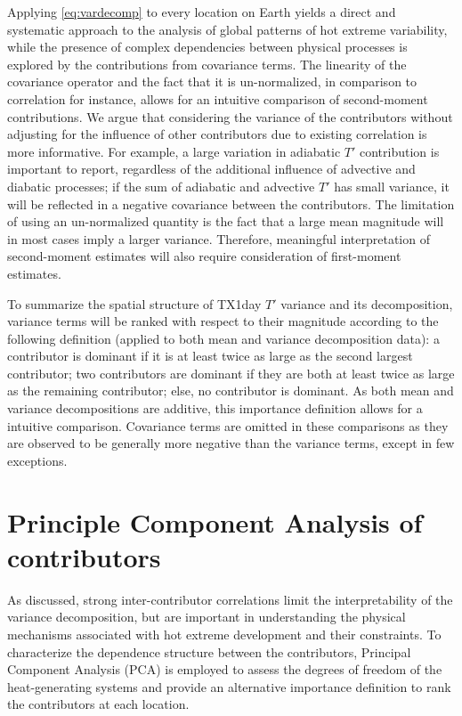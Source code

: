 \documentclass[11pt,a4paper,twoside,openright]{report}
\theoremstyle{definition}
\begin{document}
Applying \eqref{eq:vardecomp} to every location on Earth yields a direct and systematic approach to the analysis of global patterns of hot extreme variability, while the presence of complex dependencies between physical processes is explored by the contributions from covariance terms. The linearity of the covariance operator and the fact that it is un-normalized, in comparison to correlation for instance, allows for an intuitive comparison of second-moment contributions. We argue that considering the variance of the contributors without adjusting for the influence of other contributors due to existing correlation is more informative. For example, a large variation in adiabatic \(T'\) contribution is important to report, regardless of the additional influence of advective and diabatic processes; if the sum of adiabatic and advective \(T'\) has small variance, it will be reflected in a negative covariance between the contributors. The limitation of using an un-normalized quantity is the fact that a large mean magnitude will in most cases imply a larger variance. Therefore, meaningful interpretation of second-moment estimates will also require consideration of first-moment estimates.

To summarize the spatial structure of TX1day \(T'\) variance and its decomposition, variance terms will be ranked with respect to their magnitude according to the following definition (applied to both mean and variance decomposition data): a contributor is dominant if it is at least twice as large as the second largest contributor; two contributors are dominant if they are both at least twice as large as the remaining contributor; else, no contributor is dominant. As both mean and variance decompositions are additive, this importance definition allows for a intuitive comparison. Covariance terms are omitted in these comparisons as they are observed to be generally more negative than the variance terms, except in few exceptions.

\section{Principle Component Analysis of contributors}\label{principle-component-analysis-of-contributors}

As discussed, strong inter-contributor correlations limit the interpretability of the variance decomposition, but are important in understanding the physical mechanisms associated with hot extreme development and their constraints. To characterize the dependence structure between the contributors, Principal Component Analysis (PCA) is employed to assess the degrees of freedom of the heat-generating systems and provide an alternative importance definition to rank the contributors at each location.
\end{document}
